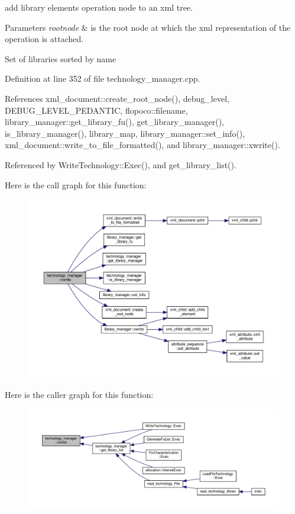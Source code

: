 add library elements operation node to an xml tree. 


\begin{DoxyParams}{Parameters}
{\em rootnode} & is the root node at which the xml representation of the operation is attached. \\
\hline
\end{DoxyParams}
Set of libraries sorted by name 

Definition at line 352 of file technology\+\_\+manager.\+cpp.



References xml\+\_\+document\+::create\+\_\+root\+\_\+node(), debug\+\_\+level, D\+E\+B\+U\+G\+\_\+\+L\+E\+V\+E\+L\+\_\+\+P\+E\+D\+A\+N\+T\+IC, flopoco\+::filename, library\+\_\+manager\+::get\+\_\+library\+\_\+fu(), get\+\_\+library\+\_\+manager(), is\+\_\+library\+\_\+manager(), library\+\_\+map, library\+\_\+manager\+::set\+\_\+info(), xml\+\_\+document\+::write\+\_\+to\+\_\+file\+\_\+formatted(), and library\+\_\+manager\+::xwrite().



Referenced by Write\+Technology\+::\+Exec(), and get\+\_\+library\+\_\+list().

Here is the call graph for this function\+:
\nopagebreak
\begin{figure}[H]
\begin{center}
\leavevmode
\includegraphics[width=350pt]{df/dc7/classtechnology__manager_acba7aabee7df6c10583d4fa5e1c52d73_cgraph}
\end{center}
\end{figure}
Here is the caller graph for this function\+:
\nopagebreak
\begin{figure}[H]
\begin{center}
\leavevmode
\includegraphics[width=350pt]{df/dc7/classtechnology__manager_acba7aabee7df6c10583d4fa5e1c52d73_icgraph}
\end{center}
\end{figure}


